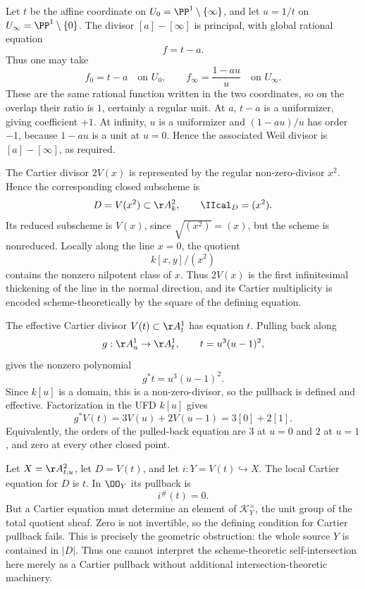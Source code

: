 
\begin{solution}
Let \(t\) be the affine coordinate on \(U_0=\PP^1\setminus\{\infty\}\), and let \(u=1/t\) on \(U_\infty=\PP^1\setminus\{0\}\).  The divisor \([a]-[\infty]\) is principal, with global rational equation
\[
f=t-a.
\]
Thus one may take
\[
f_0=t-a\quad\text{on }U_0,
\qquad
f_\infty=\frac{1-au}{u}\quad\text{on }U_\infty.
\]
These are the same rational function written in the two coordinates, so on the overlap their ratio is \(1\), certainly a regular unit.  At \(a\), \(t-a\) is a uniformizer, giving coefficient \(+1\).  At infinity, \(u\) is a uniformizer and \((1-au)/u\) has order \(-1\), because \(1-au\) is a unit at \(u=0\).  Hence the associated Weil divisor is \([a]-[\infty]\), as required.
\end{solution}

\begin{solution}
The Cartier divisor \(2V(x)\) is represented by the regular non-zero-divisor \(x^2\).  Hence the corresponding closed subscheme is
\[
D=V(x^2)\subset\AA^2_k,
\qquad
\IIcal_D=(x^2).
\]
Its reduced subscheme is \(V(x)\), since \(\sqrt{(x^2)}=(x)\), but the scheme is nonreduced.  Locally along the line \(x=0\), the quotient
\[
k[x,y]/(x^2)
\]
contains the nonzero nilpotent class of \(x\).  Thus \(2V(x)\) is the first infinitesimal thickening of the line in the normal direction, and its Cartier multiplicity is encoded scheme-theoretically by the square of the defining equation.
\end{solution}

\begin{solution}
The effective Cartier divisor \(V(t)\subset\AA^1_t\) has equation \(t\).  Pulling back along
\[
g:\AA^1_u\to\AA^1_t,
\qquad
t=u^3(u-1)^2,
\]
gives the nonzero polynomial
\[
g^*t=u^3(u-1)^2.
\]
Since \(k[u]\) is a domain, this is a non-zero-divisor, so the pullback is defined and effective.  Factorization in the UFD \(k[u]\) gives
\[
g^*V(t)=3V(u)+2V(u-1)=3[0]+2[1].
\]
Equivalently, the orders of the pulled-back equation are \(3\) at \(u=0\) and \(2\) at \(u=1\), and zero at every other closed point.
\end{solution}

\begin{solution}
Let \(X=\AA^2_{t,u}\), let \(D=V(t)\), and let \(i:Y=V(t)\hookrightarrow X\).  The local Cartier equation for \(D\) is \(t\).  In \(\OO_Y\) its pullback is
\[
i^\#(t)=0.
\]
But a Cartier equation must determine an element of \(\mathcal K_Y^\times\), the unit group of the total quotient sheaf.  Zero is not invertible, so the defining condition for Cartier pullback fails.  This is precisely the geometric obstruction: the whole source \(Y\) is contained in \(|D|\).  Thus one cannot interpret the scheme-theoretic self-intersection here merely as a Cartier pullback without additional intersection-theoretic machinery.
\end{solution}

